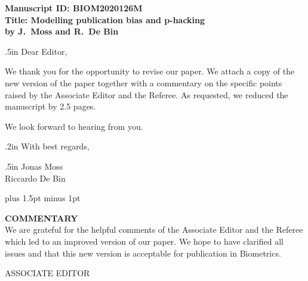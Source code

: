 \documentclass[11pt]{article}
\begin{document}
{\bf
\noindent Manuscript ID:  BIOM2020126M  \\
Title: Modelling publication bias and p-hacking \\
by J.\ Moss and R.\ De Bin}


\vglue .5in \noindent Dear Editor,


\vspace{0.5cm}

\noindent We thank you for the opportunity to revise our paper. We attach a copy of the new  version of the paper together with a commentary on the specific points raised by the Associate Editor and the Referee. As requested, we reduced the manuscript by 2.5 pages.


\vspace{0.3cm}

\noindent We look forward to hearing from you.%

\vglue .2in \noindent With best regards,

\vglue .5in
\noindent 
Jonas Moss\\
Riccardo De Bin \\

\pagestyle{empty}
\newpage



\parindent=0pt
\parskip=4pt plus 1.5pt minus 1pt


{\bf COMMENTARY} \\

We are grateful for the helpful comments of the Associate Editor and the Referee which led to an improved version of our paper. We hope to have clarified all issues and that this new version is acceptable for publication in Biometrics.

\vspace{2cm}

\begin{center}
ASSOCIATE EDITOR
\end{center}
\end{document}
